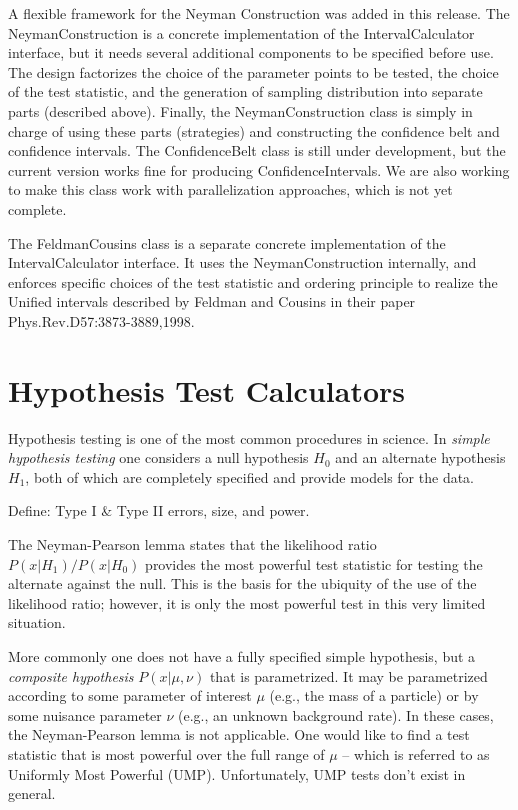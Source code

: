 \documentclass[11pt]{article}
\begin{document}
A flexible framework for the Neyman Construction was added in this release. The NeymanConstruction is a concrete implementation of the IntervalCalculator interface, but it needs several additional components to be specified before use. The design factorizes the choice of the parameter points to be tested, the choice of the test statistic, and the generation of sampling distribution into separate parts (described above).  Finally, the NeymanConstruction class is simply in charge of using these parts (strategies) and constructing the confidence belt and confidence intervals.  The ConfidenceBelt class is still under development, but the current version works fine for producing ConfidenceIntervals.  We are also working to make this class work with parallelization approaches, which is not yet complete.

The FeldmanCousins class is a separate concrete implementation of the IntervalCalculator interface.  It uses the NeymanConstruction internally, and enforces specific choices of the test statistic and ordering principle to realize the Unified intervals described by Feldman and Cousins in their paper Phys.Rev.D57:3873-3889,1998.


\section{Hypothesis Test Calculators}

Hypothesis testing is one of the most common procedures in science.  In \textit{simple hypothesis testing} one considers a null hypothesis $H_0$ and an alternate hypothesis $H_1$, both of which are completely specified and provide models for the data.  

Define: Type I \& Type II errors, size, and power.

The Neyman-Pearson lemma states that the likelihood ratio $P(x|H_1)/P(x|H_0)$ provides the most powerful test statistic for testing the alternate against the null.  This is the basis for the ubiquity of the use of the likelihood ratio; however, it is only the most powerful test in this very limited situation.

More commonly one does not have a fully specified simple hypothesis, but a \textit{composite hypothesis} $P(x|\mu,\nu)$ that is parametrized.  It may be parametrized according to some parameter of interest $\mu$ (e.g., the mass of a particle) or by some nuisance parameter $\nu$ (e.g., an unknown background rate).  In these cases, the Neyman-Pearson lemma is not applicable.  One would like to find a test statistic that is most powerful over the full range of $\mu$ -- which is referred to as Uniformly Most Powerful (UMP).  Unfortunately, UMP tests don't exist in general.  
\end{document}
